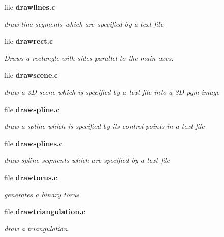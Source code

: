 \begin{CompactItemize}
\item 
file {\bf drawlines.c}
\begin{CompactList}\small\item\em draw line segments which are specified by a text file \item\end{CompactList}

\item 
file {\bf drawrect.c}
\begin{CompactList}\small\item\em Draws a rectangle with sides parallel to the main axes. \item\end{CompactList}

\item 
file {\bf drawscene.c}
\begin{CompactList}\small\item\em draw a 3D scene which is specified by a text file into a 3D pgm image \item\end{CompactList}

\item 
file {\bf drawspline.c}
\begin{CompactList}\small\item\em draw a spline which is specified by its control points in a text file \item\end{CompactList}

\item 
file {\bf drawsplines.c}
\begin{CompactList}\small\item\em draw spline segments which are specified by a text file \item\end{CompactList}

\item 
file {\bf drawtorus.c}
\begin{CompactList}\small\item\em generates a binary torus \item\end{CompactList}

\item 
file {\bf drawtriangulation.c}
\begin{CompactList}\small\item\em draw a triangulation \item\end{CompactList}


\end{CompactItemize}
